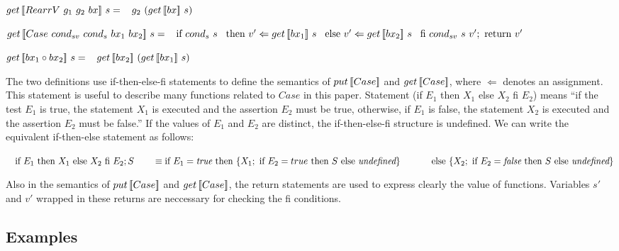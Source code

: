 \begin{multicols}{2}
\begin{definition}
        \noindent $get \, [\![RearrV \ g_1 \ g_2 \ bx]\!] \ s = \\ 
            \hspace*{3mm} g_2 \ (get \, [\![bx]\!] \ s)$

        \noindent $\getbx{\casebx{cond_{sv}}{cond_{s}}{bx_1}{bx_2}}{s} = \\
            \tab \textnormal{if} \ {cond_{s} \ s} \\
            \tab \textnormal{then} \ v' \Leftarrow \getbx{bx_1}{s} \\ 
            \tab \textnormal{else} \ v' \Leftarrow \getbx{bx_2}{s} \\ 
            \tab \textnormal{fi} \ {cond_{sv} \ s \ v'}; \ \textnormal{return} \ v'$

        \noindent $get \, [\![bx_1 \circ bx_2]\!] \ s = \\ 
            \hspace*{3mm} get \, [\![bx_2]\!] \ (get \, [\![bx_1]\!] \ s)$
    \end{definition}
\end{multicols}

The two definitions use if-then-else-fi statements 
to define the semantics of $put \, [\![Case]\!]$ and $get \, [\![Case]\!]$, where $\Leftarrow$ denotes an assignment. This statement is useful to describe many functions related to $Case$ in this paper. Statement (if $E_1$ then $X_1$ else $X_2$ fi $E_2$) means ``if the test $E_1$ is true, the statement $X_1$ is executed and the assertion $E_2$ must be true, otherwise, if $E_1$ is false, the statement $X_2$ is executed and the assertion $E_2$ must be false.'' If the values of $E_1$ and $E_2$ are distinct, the if-then-else-fi structure is undefined. We can write the equivalent if-then-else statement as follows:

\smallvspace
$\tab \text{if } E_1 \text{ then } X_1 \text{ else } X_2 \text{ fi } E_2; S\\
\tabs{2} \ \equiv \text{if }E_1 = \textit{true} \text{ then } \{ X_1; \text{ if } E_2 = true \text{ then } S \text{ else } \textit{undefined}\}\\
    \tabs{4} \text{else } \{ X_2; \text{ if } E_2 = \textit{false} \text{ then } S \text{ else } \textit{undefined} \}$
\smallvspace

Also in the semantics of $put \, [\![Case]\!]$ and $get \, [\![Case]\!]$, the return statements are used to express clearly the value of functions. Variables $s'$ and $v'$ wrapped in these returns are neccessary for checking the fi conditions.

\subsection{Examples}

